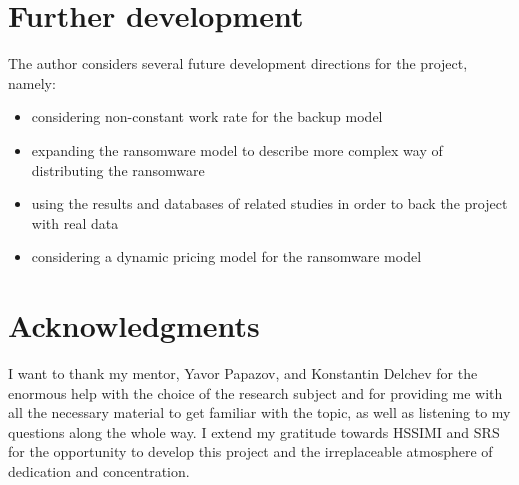 \documentclass[11pt, a4paper]{article}
\theoremstyle{definition}
\begin{document}
\section{Further development}
	The author considers several future development directions for the project, namely:
	\begin{itemize}
		\item considering non-constant work rate for the backup model
		\item expanding the ransomware model to describe more complex way of distributing the ransomware
		\item using the results and databases of related studies in order to back the project with real data\cite{paquet2019ransomware}
		\item considering a dynamic pricing model for the ransomware model
	\end{itemize}
\section{Acknowledgments}
I want to thank my mentor, Yavor Papazov, and Konstantin Delchev for the enormous help with the choice of the research subject and for providing me with all the necessary material to get familiar with the topic, as well as listening to my questions along the whole way. I extend my gratitude towards HSSIMI and SRS for the opportunity to develop this project and the irreplaceable atmosphere of dedication and concentration.

\nocite{*}

\end{document}
